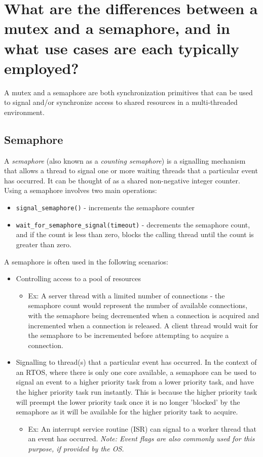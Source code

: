 \documentclass[main.tex]{subfiles}
\begin{document}
\section{What are the differences between a mutex and a semaphore, and in what use cases are each typically employed?}

\spoilerline
\noindent A mutex and a semaphore are both synchronization primitives that can be used to signal and/or synchronize access to shared resources in a multi-threaded environment. 

\subsection{Semaphore}
A \textit{semaphore} (also known as a \textit{counting semaphore}) is a signalling mechanism that allows a thread to signal one or more waiting threads that a particular event has occurred. It can be thought of as a shared non-negative integer counter.
\newline
\newline
Using a semaphore involves two main operations: \begin{itemize}
    \item \texttt{signal\_semaphore()} - increments the semaphore counter
    \item \texttt{wait\_for\_semaphore\_signal(timeout)} - decrements the semaphore count, and if the count is less than zero, blocks the calling thread until the count is greater than zero.
\end{itemize}

\noindent A semaphore is often used in the following scenarios:
\begin{itemize}
    \item Controlling access to a pool of resources 
    \begin{itemize}
        \item Ex: A server thread with a limited number of connections - the semaphore count would represent the number of available connections, with the semaphore being decremented when a connection is acquired and incremented when a connection is released. A client thread would wait for the semaphore to be incremented before attempting to acquire a connection.
    \end{itemize}
    \item Signalling to thread(s) that a particular event has occurred. In the context of an RTOS, where there is only one core available, a semaphore can be used to signal an event to a higher priority task from a lower priority task, and have the higher priority task run instantly. This is because the higher priority task will preempt the lower priority task once it is no longer 'blocked' by the semaphore as it will be available for the higher priority task to acquire.
    \begin {itemize}
        \item Ex: An interrupt service routine (ISR) can signal to a worker thread that an event has occurred. \textit{Note: Event flags are also commonly used for this purpose, if provided by the OS.}
    \end{itemize}
\end{itemize}
\end{document}
